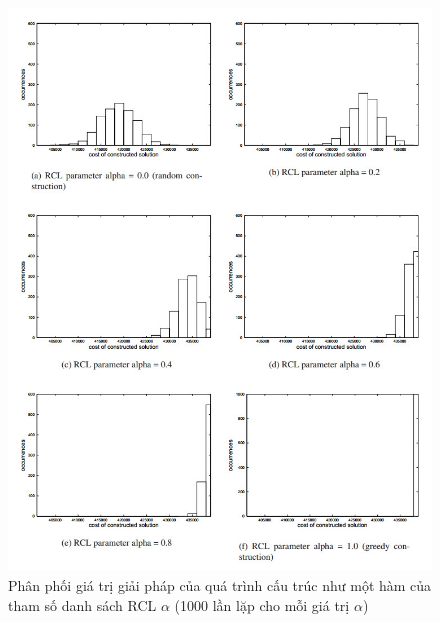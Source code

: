 \documentclass[14pt,a4paper]{report}
\begin{document}
\begin{center}
	\begin{figure}[htp]
		\begin{center}
			\includegraphics[scale=.75]{images/hinh1_6}
		\end{center}
		\caption{Phân phối giá trị giải pháp của quá trình cấu trúc như một hàm của tham số danh sách RCL $\alpha$ (1000 lần lặp cho mỗi giá trị $\alpha$)}
		\label{refhinh1}
	\end{figure}
\end{center}
\end{document}
